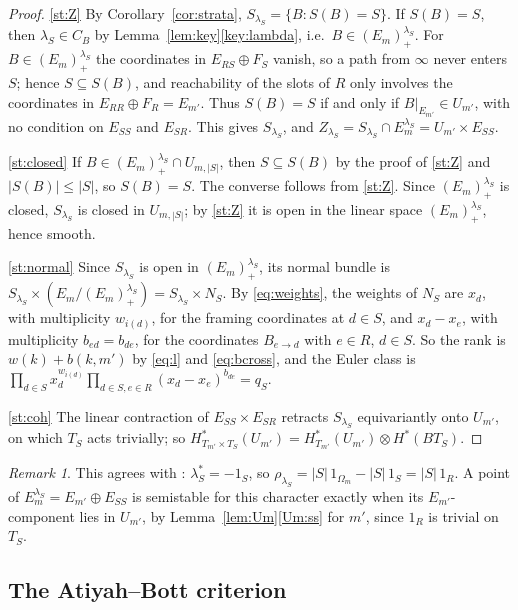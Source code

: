 \documentclass[11pt]{amsart}
\theoremstyle{definition}
\theoremstyle{remark}
\newtheorem{remark}[theorem]{Remark}
\numberwithin{equation}{section}
\newcommand{\Om}{\Omega_m}
\newcommand{\Lp}{(E_m)^{\lambda_S}_{+}}
\begin{document}
\begin{proof}
\ref{st:Z} By Corollary~\ref{cor:strata}, $S_{\lambda_S}=\{B:S(B)=S\}$. If $S(B)=S$, then
$\lambda_S\in C_B$ by Lemma~\ref{lem:key}\ref{key:lambda}, i.e.\ $B\in\Lp$. For $B\in\Lp$ the
coordinates in $E_{RS}\oplus F_S$ vanish, so a path from $\infty$ never enters $S$; hence
$S\subseteq S(B)$, and reachability of the slots of $R$ only involves the coordinates in
$E_{RR}\oplus F_R=E_{m'}$. Thus $S(B)=S$ if and only if $B|_{E_{m'}}\in U_{m'}$, with no condition on
$E_{SS}$ and $E_{SR}$. This gives $S_{\lambda_S}$, and
$Z_{\lambda_S}=S_{\lambda_S}\cap E_m^{\lambda_S}=U_{m'}\times E_{SS}$.

\ref{st:closed} If $B\in\Lp\cap U_{m,|S|}$, then $S\subseteq S(B)$ by the proof of \ref{st:Z} and
$|S(B)|\le|S|$, so $S(B)=S$. The converse follows from \ref{st:Z}. Since $\Lp$ is closed,
$S_{\lambda_S}$ is closed in $U_{m,|S|}$; by \ref{st:Z} it is open in the linear space $\Lp$, hence
smooth.

\ref{st:normal} Since $S_{\lambda_S}$ is open in $\Lp$, its normal bundle is
$S_{\lambda_S}\times(E_m/\Lp)=S_{\lambda_S}\times N_S$. By \eqref{eq:weights}, the weights of $N_S$ are
$x_d$, with multiplicity $w_{i(d)}$, for the framing coordinates at $d\in S$, and $x_d-x_e$, with
multiplicity $b_{ed}=b_{de}$, for the coordinates $B_{e\to d}$ with $e\in R$, $d\in S$. So the rank is
$w(k)+b(k,m')$ by \eqref{eq:l} and \eqref{eq:bcross}, and the Euler class is
$\prod_{d\in S}x_d^{w_{i(d)}}\prod_{d\in S,e\in R}(x_d-x_e)^{b_{de}}=q_S$.

\ref{st:coh} The linear contraction of $E_{SS}\times E_{SR}$ retracts $S_{\lambda_S}$ equivariantly onto
$U_{m'}$, on which $T_S$ acts trivially; so
$H^*_{T_{m'}\times T_S}(U_{m'})=H^*_{T_{m'}}(U_{m'})\otimes H^*(BT_S)$.
\end{proof}

\begin{remark}
This agrees with \cite[Proposition~2.18]{Hos}: $\lambda_S^*=-1_S$, so
$\rho_{\lambda_S}=|S|\,1_{\Om}-|S|\,1_S=|S|\,1_R$. A point of $E_m^{\lambda_S}=E_{m'}\oplus E_{SS}$ is
semistable for this character exactly when its $E_{m'}$-component lies in $U_{m'}$, by
Lemma~\ref{lem:Um}\ref{Um:ss} for $m'$, since $1_R$ is trivial on $T_S$.
\end{remark}

\subsection{The Atiyah--Bott criterion}\label{subsec:AB}
\end{document}
